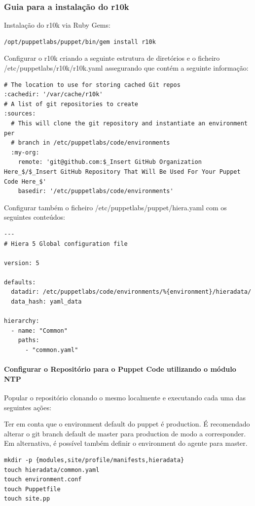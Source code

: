 \documentclass{article}
\begin{document}
\subsubsection{Guia para a instalação do r10k}

Instalação do r10k via Ruby Gems:

\begin{lstlisting}
/opt/puppetlabs/puppet/bin/gem install r10k
\end{lstlisting}

Configurar o r10k criando a seguinte estrutura de diretórios e o ficheiro /etc/puppetlabs/r10k/r10k.yaml assegurando que contém a seguinte informação:
\begin{lstlisting}
# The location to use for storing cached Git repos
:cachedir: '/var/cache/r10k'
# A list of git repositories to create
:sources:
  # This will clone the git repository and instantiate an environment per
  # branch in /etc/puppetlabs/code/environments
  :my-org:
    remote: 'git@github.com:$_Insert GitHub Organization Here_$/$_Insert GitHub Repository That Will Be Used For Your Puppet Code Here_$'
    basedir: '/etc/puppetlabs/code/environments'
\end{lstlisting}

Configurar também o ficheiro /etc/puppetlabs/puppet/hiera.yaml com os seguintes conteúdos:

\begin{lstlisting}
---
# Hiera 5 Global configuration file

version: 5

defaults:
  datadir: /etc/puppetlabs/code/environments/%{environment}/hieradata/
  data_hash: yaml_data

hierarchy:
  - name: "Common"
    paths:
      - "common.yaml"
\end{lstlisting}

\paragraph{Configurar o Repositório para o Puppet Code utilizando o módulo NTP}
Popular o repositório clonando o mesmo localmente e executando cada uma das seguintes ações:

Ter em conta que o environment default do puppet é production. É recomendado alterar o git branch default de master para production de modo a corresponder. Em alternativa, é possível também definir o environment do agente para master.

\begin{lstlisting}
mkdir -p {modules,site/profile/manifests,hieradata}
touch hieradata/common.yaml
touch environment.conf
touch Puppetfile
touch site.pp
\end{lstlisting}
\end{document}
